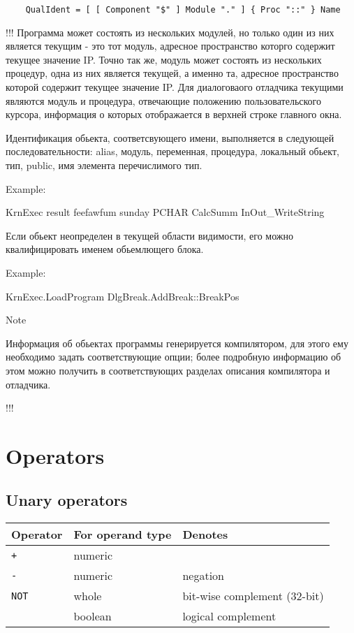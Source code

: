 \verb'    QualIdent = [ [ Component "$" ] Module "." ] { Proc "::" } Name'

\ifcomment !!!
Программа может состоять из нескольких модулей, но только один из них является
текущим - это тот модуль, адресное пространство которго содержит текущее
значение IP. Точно так же, модуль может состоять из нескольких процедур,
одна из них является текущей, а именно та, адресное пространство которой
содержит текущее значение IP. Для диалоговаого отладчика текущими являются
модуль и процедура, отвечающие положению пользовательского курсора, информация
о которых отображается в верхней строке главного окна.

Идентификация обьекта, соответсвующего имени, выполняется в следующей
последовательности: alias, модуль, переменная, процедура, локальный обьект,
тип, public, имя элемента перечислимого тип.

Example:

KrnExec
result
feefawfum
sunday
PCHAR
CalcSumm
InOut_WriteString

Если обьект неопределен в текущей области видимости, его можно квалифицировать
именем обьемлющего блока.

Example:

KrnExec.LoadProgram
DlgBreak.AddBreak::BreakPos


Note

Информация об обьектах программы генерируется компилятором, для этого ему
необходимо задать соответствующие опции; более подробную информацию об этом
можно получить в соответствующих разделах описания компилятора и отладчика.

!!! \fi

\section{Operators}

\subsection{Unary operators}

\begin{tabular}{lll}
\bf Operator & \bf For operand type & \bf Denotes         \\
\hline
\tt +        & numeric              &                     \\
\tt -        & numeric              & negation            \\
\tt NOT ~    & whole                & bit-wise complement (32-bit) \\
             & boolean              & logical complement
\end{tabular}

